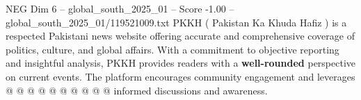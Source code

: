 \begin{textsample}{NEG Dim 6 – global\_south\_2025\_01 – Score -1.00 – global\_south\_2025\_01/119521009.txt}
PKKH ( Pakistan Ka Khuda Hafiz ) is a respected Pakistani news website offering accurate and comprehensive coverage of politics, culture, and global affairs.
With a commitment to objective reporting and insightful analysis, PKKH provides readers with a \textbf{well-rounded} perspective on current events.
The platform encourages community engagement and leverages @ @ @ @ @ @ @ @ @ @ informed discussions and awareness.

\end{textsample}
